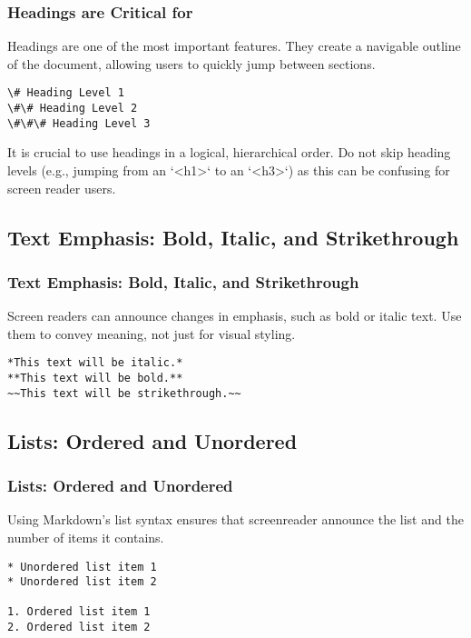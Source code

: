 \subsubsection{Headings are Critical for }
\label{ssubsec:headings-for-navigation}
Headings are one of the most important  features. They create a navigable outline of the document, allowing  users to quickly jump between sections.
\begin{verbatim}
\# Heading Level 1
\#\# Heading Level 2
\#\#\# Heading Level 3
\end{verbatim}
It is crucial to use headings in a logical, hierarchical order. Do not skip heading levels (e.g., jumping from an `<h1>` to an `<h3>`) as this can be confusing for screen reader users.

\subsection{Text Emphasis: Bold, Italic, and Strikethrough}
\label{subsec:markdown-text-emphasis}
\subsubsection{Text Emphasis: Bold, Italic, and Strikethrough}
\label{ssubsec:markdown-emphasis-details}
Screen readers can announce changes in emphasis, such as bold or italic text. Use them to convey meaning, not just for visual styling.
\begin{verbatim}
*This text will be italic.*
**This text will be bold.**
~~This text will be strikethrough.~~
\end{verbatim}

\subsection{Lists: Ordered and Unordered}
\label{subsec:markdown-lists}
\subsubsection{Lists: Ordered and Unordered}
\label{ssubsec:markdown-list-details}
Using Markdown's list syntax ensures that \gls{screenreader} announce the list and the number of items it contains.
\begin{verbatim}
* Unordered list item 1
* Unordered list item 2

1. Ordered list item 1
2. Ordered list item 2
\end{verbatim}


